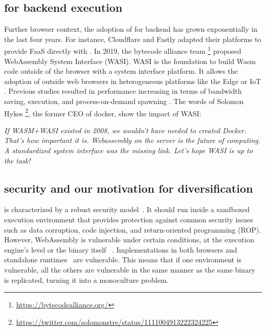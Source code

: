 \subsection*{\wasm for backend execution}


Further browser context, the adoption of \wasm for backend has grown exponentially in the last four years. For instance, Cloudflare and Fastly adapted their platforms to provide FaaS directly with \wasm. In 2019, the bytecode alliance team \footnote{\url{https://bytecodealliance.org/}} proposed WebAssembly System Interface (WASI). WASI is the foundation to build Wasm code outside of the browser with a system interface platform. It allows the adoption of \wasm outside web browsers \cite{bryant2020webassembly} in heterogeneous platforms like the Edge or IoT \cite{Narayan2021Swivel,Sledge}. Previous studies resulted in performance increasing in terms of bandwidth saving, execution, and process-on-demand spawning \cite{9640153, wen2020wasmachine}. The words of Solomon Hykes \footnote{\url{https://twitter.com/solomonstre/status/1111004913222324225}}, the former CEO of docker, show the impact of WASI: 

\begin{displayquote}
\textit{
    If WASM+WASI existed in 2008, we wouldn't have needed to created Docker. That's how important it is. Webassembly on the server is the future of computing. A standardized system interface was the missing link. Let's hope WASI is up to the task!
}
\end{displayquote}

\subsection*{\wasm security and our motivation for diversification}


\wasm is characterized by a robust security model~\cite{WebAssemblySecurity}. It should run inside a sandboxed execution environment that provides protection against common security issues such as data corruption, code injection, and return-oriented programming (ROP). However, WebAssembly is vulnerable under certain conditions, at the execution engine's level \cite{ChromeZero} or the binary itself ~\cite{usenixWasm2020}.
Implementations in both browsers and standalone runtimes~\cite{Narayan2021Swivel} are vulnerable.
This means that if one environment is vulnerable, all the others are vulnerable in the same manner as the same \wasm binary is replicated, turning it into a monoculture problem.


